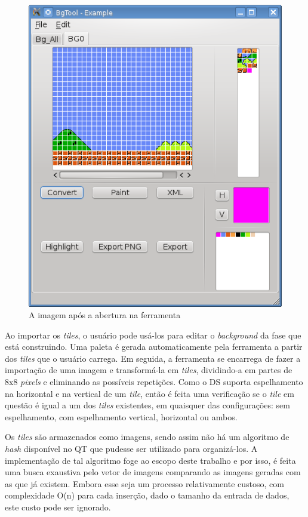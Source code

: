 \documentclass[brazil]{abnt}
\begin{document}
\begin{figure}[h!]
\centering
\includegraphics[scale=1]{imgs/bgtool1.png}
\caption{A imagem após a abertura na ferramenta} 
\end{figure}

Ao importar os \textit{tiles}, o usuário pode usá-los para editar o \textit{background} da fase que está construindo. Uma paleta é gerada automaticamente pela ferramenta a partir dos \textit{tiles} que o usuário carrega. Em seguida, a ferramenta se encarrega de fazer a importação de uma imagem e transformá-la em \textit{tiles}, dividindo-a em partes de 8x8 \textit{pixels} e eliminando as possíveis repetições. Como o DS suporta espelhamento na horizontal e na vertical de um \textit{tile}, então é feita uma verificação se o \textit{tile} em questão é igual a um dos \textit{tiles} existentes, em quaisquer das configurações: sem espelhamento, com espelhamento vertical, horizontal ou ambos.

Os \textit{tiles} são armazenados como imagens, sendo assim não há um algoritmo de \textit{hash} disponível no QT que pudesse ser utilizado para organizá-los. A implementação de tal algoritmo foge ao escopo deste trabalho e por isso, é feita uma busca exaustiva pelo vetor de imagens comparando as imagens geradas com as que já existem. Embora esse seja um processo relativamente custoso, com complexidade O(n) para cada inserção, dado o tamanho da entrada de dados, este custo pode ser ignorado.
\end{document}
